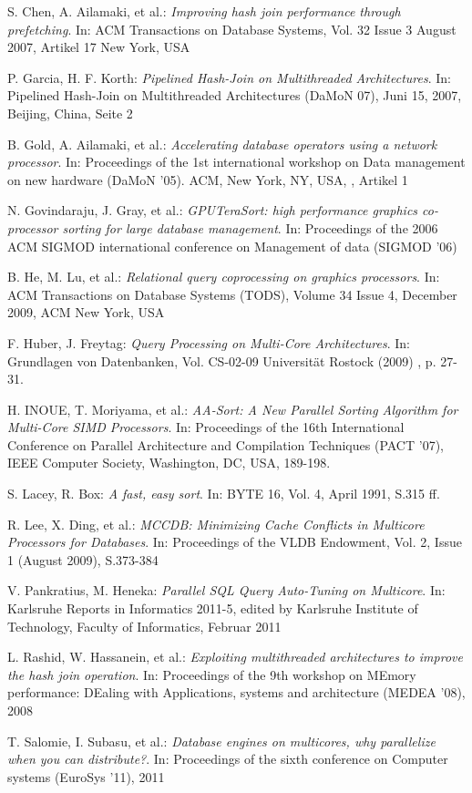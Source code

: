 \begin{thebibliography}{-----------}
 S. Chen, A. Ailamaki, et al.: {\textit{Improving hash join performance through prefetching}}. In: ACM Transactions on Database Systems, Vol. 32 Issue 3 August 2007, Artikel 17 New York, USA

 P. Garcia, H. F. Korth: {\textit{Pipelined Hash-Join on Multithreaded Architectures}}. In: Pipelined Hash-Join on Multithreaded Architectures (DaMoN 07), Juni 15, 2007, Beijing, China, Seite 2

 B. Gold, A. Ailamaki, et al.: {\textit{Accelerating database operators using a network processor}}. In: Proceedings of the 1st international workshop on Data management on new hardware (DaMoN '05). ACM, New York, NY, USA, , Artikel 1 

 N. Govindaraju, J. Gray, et al.: {\textit{GPUTeraSort: high performance graphics co-processor sorting for large database management}}. In: Proceedings of the 2006 ACM SIGMOD international conference on Management of data (SIGMOD '06)

 B. He, M. Lu, et al.: {\textit{Relational query coprocessing on graphics processors}}. In: ACM Transactions on Database Systems (TODS), Volume 34 Issue 4, December 2009, ACM New York, USA 

 F. Huber, J. Freytag: {\textit{Query Processing on Multi-Core Architectures}}. In: Grundlagen von Datenbanken, Vol. CS-02-09 Universität Rostock (2009) , p. 27-31.

 H. INOUE, T. Moriyama, et al.: {\textit{AA-Sort: A New Parallel Sorting Algorithm for Multi-Core SIMD Processors}}. In: Proceedings of the 16th International Conference on Parallel Architecture and Compilation Techniques (PACT '07), IEEE Computer Society, Washington, DC, USA, 189-198.

 S. Lacey, R. Box: {\textit{A fast, easy sort}}. In: BYTE 16, Vol. 4, April 1991, S.315 ff.

 R. Lee, X. Ding, et al.: {\textit{MCCDB: Minimizing Cache Conflicts in Multicore Processors for Databases}}. In: Proceedings of the VLDB Endowment, Vol. 2, Issue 1 (August 2009), S.373-384

 V. Pankratius, M. Heneka: {\textit{Parallel SQL Query Auto-Tuning on Multicore}}. In: Karlsruhe Reports in Informatics 2011-5, edited by Karlsruhe Institute of Technology, Faculty of Informatics, Februar 2011

 L. Rashid, W. Hassanein, et al.: {\textit{Exploiting multithreaded architectures to improve the hash join operation}}. In: Proceedings of the 9th workshop on MEmory performance: DEaling with Applications, systems and architecture (MEDEA '08), 2008

 T. Salomie, I. Subasu, et al.: {\textit{Database engines on multicores, why parallelize when you can distribute?}}. In: Proceedings of the sixth conference on Computer systems (EuroSys '11), 2011
 
\end{thebibliography}